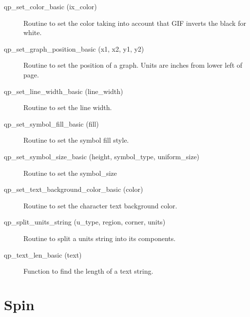 \begin{description}
\label{r:qp.set.color.basic}
\item[qp_set_color_basic (ix_color)  ] \Newline 
Routine to set the color taking into account that GIF
inverts the black for white.

\label{r:qp.set.graph.position.basic}
\item[qp_set_graph_position_basic (x1, x2, y1, y2)] \Newline 
Routine to set the position of a graph.
Units are inches from lower left of page.

\label{r:qp.set.line.width.basic}
\item[qp_set_line_width_basic (line_width)] \Newline 
Routine to set the line width.

\label{r:qp.set.symbol.fill.basic}
\item[qp_set_symbol_fill_basic (fill)] \Newline 
Routine to set the symbol fill style.

\label{r:qp.set.symbol.size.basic}
\item[qp_set_symbol_size_basic (height, symbol_type, uniform_size)] \Newline 
Routine to set the symbol_size

\label{r:qp.set.text.background.color.basic}
\item[qp_set_text_background_color_basic (color)] \Newline 
Routine to set the character text background color.

\label{r:qp.split.units.string}
\item[qp_split_units_string (u_type, region, corner, units)] \Newline 
     Routine to split a units string into its components.

\label{r:qp.text.len.basic}
\item[qp_text_len_basic (text)] \Newline 
Function to find the length of a text string.

\end{description}

\section{Spin}
\label{r:spin}    

